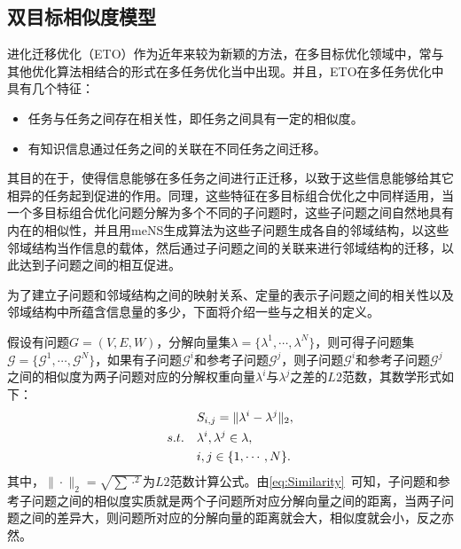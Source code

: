 \subsection{双目标相似度模型}
\label{subsec:NST:邻域结构迁移:双目标相似度模型}
进化迁移优化（ETO）作为近年来较为新颖的方法，在多目标优化领域中，常与其他优化算法相结合的形式在多任务优化当中出现\cite{feng2020explicit,lin2020effective,gupta2016multiobjective}。并且，ETO在多任务优化中具有几个特征：
\begin{itemize}
    \item 任务与任务之间存在相关性，即任务之间具有一定的相似度。
    \item 有知识信息通过任务之间的关联在不同任务之间迁移。
\end{itemize}
其目的在于，使得信息能够在多任务之间进行正迁移，以致于这些信息能够给其它相异的任务起到促进的作用。同理，这些特征在多目标组合优化之中同样适用，当一个多目标组合优化问题分解为多个不同的子问题时，这些子问题之间自然地具有内在的相似性，并且用meNS生成算法为这些子问题生成各自的邻域结构，以这些邻域结构当作信息的载体，然后通过子问题之间的关联来进行邻域结构的迁移，以此达到子问题之间的相互促进。
\par
为了建立子问题和邻域结构之间的映射关系、定量的表示子问题之间的相关性以及邻域结构中所蕴含信息量的多少，下面将介绍一些与之相关的定义。
\par
\begin{definition}
    \label{def:Similarity}
    假设有问题$G = (V,E,W)$，分解向量集$\lambda = \{ \lambda^1, \cdots, \lambda^N \}$，则可得子问题集$\mathcal{G} = \{ \mathcal{G}^1, \cdots , \mathcal{G}^N \}$，如果有子问题$\mathcal{G}^i$和参考子问题$\mathcal{G}^j$，则子问题$\mathcal{G}^i$和参考子问题$\mathcal{G}^j$之间的相似度为两子问题对应的分解权重向量$\lambda^i$与$\lambda^j$之差的$L2$范数，其数学形式如下：
    \begin{align}
        \label{eq:Similarity}
        & S_{i,j}  = \|\lambda^i - \lambda^j\|_2, \\
        s.t. \quad & \lambda^i, \lambda^j \in \lambda, \notag \\
        & i,j \in \{1, \cdots, N\}. \notag
    \end{align}
    其中，$\| \cdot \|_2 = \sqrt{\sum \cdot^2}$为$L2$范数计算公式。由\autoref{eq:Similarity}~可知，子问题和参考子问题之间的相似度实质就是两个子问题所对应分解向量之间的距离，当两子问题之间的差异大，则问题所对应的分解向量的距离就会大，相似度就会小，反之亦然。
\end{definition}
